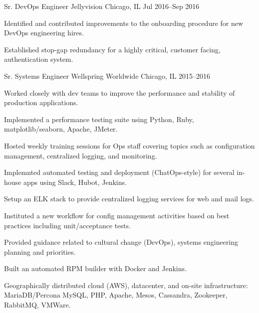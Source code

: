 \begin{cventries}
  \cventry
    {Sr. DevOps Engineer} %
    {Jellyvision} %
    {Chicago, IL} %
    {Jul 2016--Sep 2016} %
    {
      \begin{cvitems} %
        \item {Identified and contributed improvements to the onboarding procedure for new DevOps engineering hires.}
        \item {Established stop-gap redundancy for a highly critical, customer facing, authentication system.}
      \end{cvitems}
    }
    {}

  \cventry
    {Sr. Systems Engineer} %
    {Wellspring Worldwide} %
    {Chicago, IL} %
    {2015--2016} %
    {
      \begin{cvitems} %
        \item {Worked closely with dev teams to improve the performance and stability of production applications.}
        \item {Implemented a performance testing suite using Python, Ruby, matplotlib/seaborn, Apache, JMeter.}
        \item {Hosted weekly training sessions for Ops staff covering topics such as configuration management, centralized logging, and monitoring.}
        \item {Implemnted automated testing and deployment (ChatOps-style) for several in-house apps using Slack, Hubot, Jenkins.}
        \item {Setup an ELK stack to provide centralized logging services for web and mail logs.}
        \item {Instituted a new workflow for config management activities based on best practices including unit/acceptance tests.}
        \item {Provided guidance related to cultural change (DevOps), systems engineering planning and priorities.}
        \item {Built an automated RPM builder with Docker and Jenkins.}
      \end{cvitems}
    }
    {
      \begin{cventrysummary}
        Geographically distributed cloud (AWS), datacenter, and on-site infrastructure: \\ MariaDB/Percona MySQL, PHP, Apache, Mesos, Cassandra, Zookeeper, RabbitMQ, VMWare.
      \end{cventrysummary}
    }


\end{cventries}

